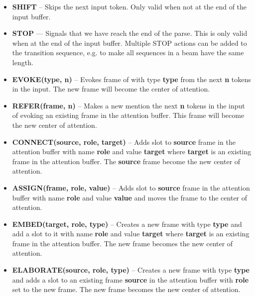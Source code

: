 \documentclass[11pt,a4paper]{article}
\begin{document}
\begin{itemize}
  \item {\bf SHIFT} -- Skips the next input token. Only valid when not at the
        end of the input buffer.

  \item {\bf STOP} --- Signals that we have reach the end of the parse. This is
        only valid when at the end of the input buffer. Multiple STOP actions
        can be added to the transition sequence, e.g. to make all sequences in a
        beam have the same length.

  \item {\bf EVOKE(type, n)} -- Evokes frame of with type {\bf type} from
        the next {\bf n} tokens in the input. The new frame will become the
        center of attention.

  \item {\bf REFER(frame, n)} -- Makes a new mention the next {\bf n} tokens in
        the input of evoking an existing frame in the attention buffer. This
        frame will become the new center of attention.

  \item {\bf CONNECT(source, role, target)} -- Adds slot to {\bf source} frame
        in the attention buffer with name {\bf role} and value {\bf target}
        where {\bf target} is an existing frame in the attention buffer. The
        {\bf source} frame become the new center of attention.

  \item {\bf ASSIGN(frame, role, value)} -- Adds slot to {\bf source} frame in
        the attention buffer  with name {\bf role} and value {\bf value} and
        moves the frame to the center of attention.

  \item {\bf EMBED(target, role, type)} -- Creates a new frame with
        type {\bf type} and add a slot to it with name {\bf role} and value
        {\bf target} where {\bf target} is an existing frame in the attention
        buffer. The new frame becomes the new center of attention.

  \item {\bf ELABORATE(source, role, type)} -- Creates a new frame with type
        {\bf type} and adds a slot to an existing frame {\bf source} in the
        attention buffer with {\bf role} set to the new frame. The new frame
        becomes the new center of attention.
\end{itemize}
\end{document}
